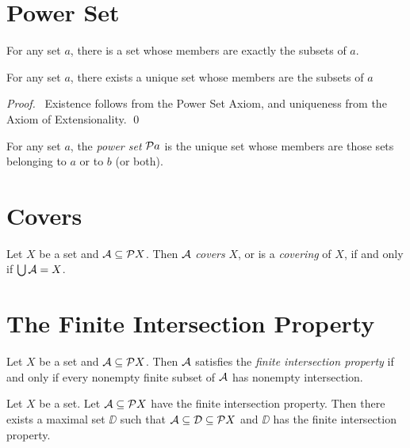 \section{Power Set}

\begin{axiom}
    For any set $a$, there is a set whose members are exactly the subsets of $a$.    
\end{axiom}

\begin{proposition}
    For any set $a$, there exists a unique set whose members are the subsets of $a$
\end{proposition}

\begin{proof}
    \pf\ Existence follows from the Power Set Axiom, and uniqueness from the Axiom of Extensionality. \qed
\end{proof}

\begin{definition}
    For any set $a$, the \emph{power set} $\pow a$ is the unique set whose members are those sets belonging to $a$ or to $b$ (or both).
\end{definition}

\section{Covers}

\begin{definition}[Cover]
    Let $X$ be a set and $\AA \subseteq \pow X$. Then $\AA$ \emph{covers} $X$,
    or is a \emph{covering} of $X$, if and only if $\bigcup \AA = X$.
\end{definition}

\section{The Finite Intersection Property}

\begin{definition}
    Let $X$ be a set and $\AA \subseteq \pow X$. Then $\AA$ satisfies the \emph{finite intersection property} if and only if every nonempty finite subset of $\AA$
    has nonempty intersection.
\end{definition}

\begin{lemma}
    \label{lemma:maximal_finite_intersection_property}
    Let $X$ be a set. Let $\AA \subseteq \pow X$ have the finite intersection property.
    Then there exists a maximal set $\DD$ such that $\AA \subseteq \DD \subseteq \pow X$
    and $\DD$ has the finite intersection property.
\end{lemma}

